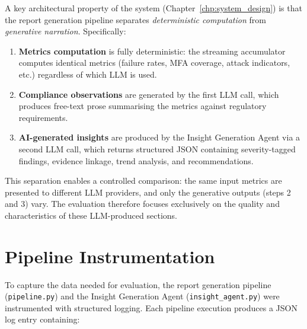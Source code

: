 \documentclass[]{UCD_CS_FYP_Report}
\begin{document}
A key architectural property of the system (Chapter~\ref{chp:system_design}) is that the report generation pipeline separates \textit{deterministic computation} from \textit{generative narration}. Specifically:

\begin{enumerate}
    \item \textbf{Metrics computation} is fully deterministic: the streaming accumulator computes identical metrics (failure rates, MFA coverage, attack indicators, etc.) regardless of which LLM is used.
    \item \textbf{Compliance observations} are generated by the first LLM call, which produces free-text prose summarising the metrics against regulatory requirements.
    \item \textbf{AI-generated insights} are produced by the Insight Generation Agent via a second LLM call, which returns structured JSON containing severity-tagged findings, evidence linkage, trend analysis, and recommendations.
\end{enumerate}

This separation enables a controlled comparison: the same input metrics are presented to different LLM providers, and only the generative outputs (steps 2 and 3) vary. The evaluation therefore focuses exclusively on the quality and characteristics of these LLM-produced sections.

\section{Pipeline Instrumentation}
\label{sec:instrumentation}

To capture the data needed for evaluation, the report generation pipeline (\texttt{pipeline.py}) and the Insight Generation Agent (\texttt{insight\_agent.py}) were instrumented with structured logging. Each pipeline execution produces a JSON log entry containing:
\end{document}
